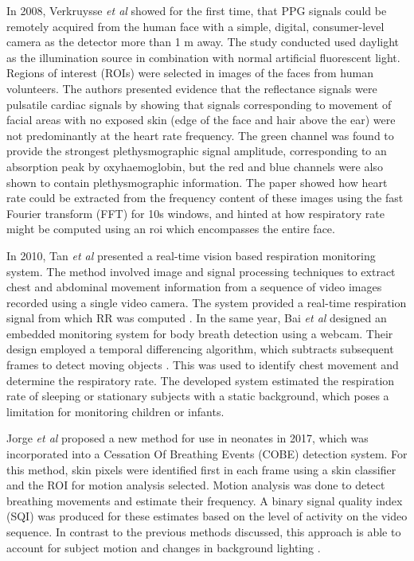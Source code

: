 In 2008,  Verkruysse \textit{et al}\cite{verkruysse2008remote} showed for the first time, that PPG signals could be remotely acquired from the human face with a simple, digital, consumer-level camera as the detector more than 1 m away. The study conducted used daylight as the illumination source in combination with normal artificial fluorescent light. Regions of interest (ROIs) were selected in images of the faces from human volunteers. 
The authors presented evidence that the reflectance signals were pulsatile cardiac signals by showing that signals corresponding to movement of facial areas with no exposed skin (edge of the face and hair above the ear) were not predominantly at the heart rate frequency. The green channel was found to provide the strongest plethysmographic signal amplitude, corresponding to an absorption peak by oxyhaemoglobin, but the red and blue channels were also shown to contain plethysmographic information. The paper showed how heart rate could be extracted from the frequency content of these images using the fast Fourier transform (FFT) for 10s windows, and hinted at how respiratory rate might be computed using an \gls{roi} which encompasses the entire face.

In 2010, Tan \textit{et al} presented a real-time vision based respiration monitoring system. The method involved image and signal processing techniques to extract chest and abdominal movement information from a sequence of video images recorded using a single video camera. The system provided a real-time respiration signal from which RR was computed \cite{tan2010real}. In the same year, Bai \textit{et al}\cite{bai2010design} designed an embedded monitoring system for body breath detection using a webcam. 
Their design employed a temporal differencing algorithm, which subtracts subsequent frames to detect moving objects \cite{lien2008monitoring}. This was used to identify chest movement and determine the respiratory rate. The developed system estimated the respiration rate of sleeping or stationary subjects with a static background, which poses a limitation for monitoring children or infants.

Jorge \textit{et al} proposed a new method for use in neonates in 2017, which was incorporated into a Cessation Of Breathing Events (COBE) detection system. For this method, skin pixels were identified first in each frame using a skin classifier and the ROI for motion analysis selected. Motion analysis was done to detect breathing movements and estimate their frequency. A binary signal quality index (SQI) was produced for these estimates based on the level of activity on the video sequence. In contrast to the previous methods discussed, this approach is able to account for subject motion and changes in background lighting \cite{jorge2017non}.

